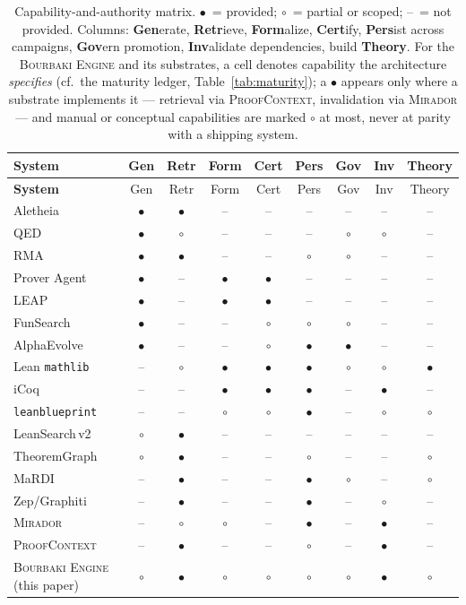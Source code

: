 \documentclass[11pt]{amsart}
\theoremstyle{definition}
\theoremstyle{remark}
\newcommand{\engine}{\textsc{Bourbaki Engine}}
\newcommand{\mirador}{\textsc{Mirador}}
\newcommand{\pc}{\textsc{ProofContext}}
\newcommand{\yes}{$\bullet$}
\newcommand{\pt}{$\circ$}
\newcommand{\no}{--}
\begin{document}
{\scriptsize
\begin{longtable}{@{}p{}cccccccc@{}}
\caption{Capability-and-authority matrix. \yes~= provided; \pt~= partial or
scoped; \no~= not provided. Columns: \textbf{Gen}erate, \textbf{Retr}ieve,
\textbf{Form}alize, \textbf{Cert}ify, \textbf{Pers}ist across campaigns,
\textbf{Gov}ern promotion, \textbf{Inv}alidate dependencies, build
\textbf{Theory}. For the \engine{} and its substrates, a cell denotes capability
the architecture \emph{specifies} (cf.\ the maturity ledger,
Table~\ref{tab:maturity}); a \yes{} appears only where a substrate implements it
--- retrieval via \pc{}, invalidation via \mirador{} --- and manual or conceptual
capabilities are marked \pt{} at most, never at parity with a shipping system.}
\label{tab:matrix}\\
\toprule
\textbf{System} & Gen & Retr & Form & Cert & Pers & Gov & Inv & Theory\\
\midrule
\endfirsthead
\toprule
\textbf{System} & Gen & Retr & Form & Cert & Pers & Gov & Inv & Theory\\ \midrule
\endhead
Aletheia~\cite{Aletheia26} & \yes & \yes & \no & \no & \no & \no & \no & \no\\
QED~\cite{QED26} & \yes & \pt & \no & \no & \no & \pt & \pt & \no\\
RMA~\cite{RMA26} & \yes & \yes & \no & \no & \pt & \pt & \no & \no\\
Prover Agent~\cite{ProverAgent25} & \yes & \no & \yes & \yes & \no & \no & \no & \no\\
LEAP~\cite{LEAP26} & \yes & \no & \yes & \yes & \no & \no & \no & \no\\
FunSearch~\cite{RomeraParedes24} & \yes & \no & \no & \pt & \pt & \pt & \no & \no\\
AlphaEvolve~\cite{AlphaEvolve25} & \yes & \no & \no & \pt & \yes & \yes & \no & \no\\
Lean \texttt{mathlib}~\cite{mathlib20} & \no & \pt & \yes & \yes & \yes & \pt & \pt & \yes\\
iCoq~\cite{Celik17} & \no & \no & \yes & \yes & \yes & \no & \yes & \no\\
\texttt{leanblueprint}~\cite{Massot,Tao23} & \no & \no & \pt & \pt & \yes & \no & \pt & \pt\\
LeanSearch\,v2~\cite{LeanSearch26} & \pt & \yes & \no & \no & \no & \no & \no & \no\\
TheoremGraph~\cite{TheoremGraph26} & \pt & \yes & \no & \no & \pt & \no & \no & \pt\\
MaRDI~\cite{MaRDI23} & \no & \yes & \no & \no & \yes & \pt & \no & \pt\\
Zep/Graphiti~\cite{Zep25} & \no & \yes & \no & \no & \yes & \no & \pt & \no\\
\midrule
\mirador{}~\cite{lucius2026mirador} & \no & \pt & \pt & \no & \yes & \no & \yes & \no\\
\pc{}~\cite{lucius2026proofcontext} & \no & \yes & \no & \no & \pt & \no & \yes & \no\\
\engine{} (this paper) & \pt & \yes & \pt & \pt & \pt & \pt & \yes & \pt\\
\bottomrule
\end{longtable}
}
\end{document}
